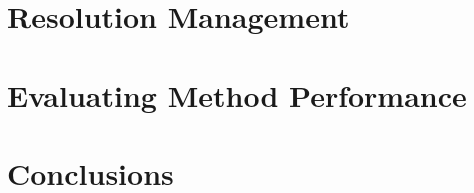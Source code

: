 \documentclass{beamer}
\begin{document}
\section[Resolution]{Resolution Management}
\section[Evaluating]{Evaluating Method Performance}
\section{Conclusions}
\end{document}
